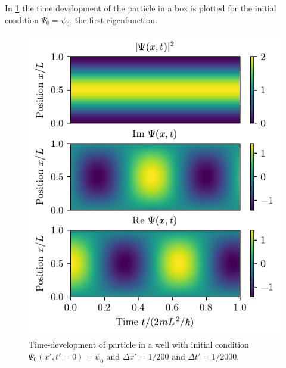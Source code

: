 In \cref{fig:box_time_psi0} the time development of the particle in a box is plotted for the initial condition $\Psi_0 = \psi_0$, the first eigenfunction.

\begin{figure}[ht!]%
\centering%
\includegraphics{figs/box_psi0.pdf}%
\caption{Time-development of particle in a well with initial condition $\Psi_0(x',t'=0) = \psi_0$ and $\Delta x' = 1/200$ and $\Delta t' = 1/2000$. \label{fig:box_time_psi0}}%
\end{figure}

